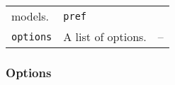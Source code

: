 \documentclass[article]{jss}
\begin{document}
\begin{longtable}[]{@{}lll@{}}
\begin{minipage}[t]{0.66\columnwidth}
models.\strut
\end{minipage} & \begin{minipage}[t]{0.11\columnwidth}\raggedright
\texttt{\textquotesingle{}pref\textquotesingle{}}\strut
\end{minipage}\tabularnewline
\begin{minipage}[t]{0.14\columnwidth}\raggedright
\texttt{options}\strut
\end{minipage} & \begin{minipage}[t]{0.66\columnwidth}\raggedright
A list of options.\strut
\end{minipage} & \begin{minipage}[t]{0.11\columnwidth}\raggedright
--\strut
\end{minipage}\tabularnewline
\bottomrule
\end{longtable}

\hypertarget{options}{%
\subsubsection{Options}\label{options}}
\end{document}
